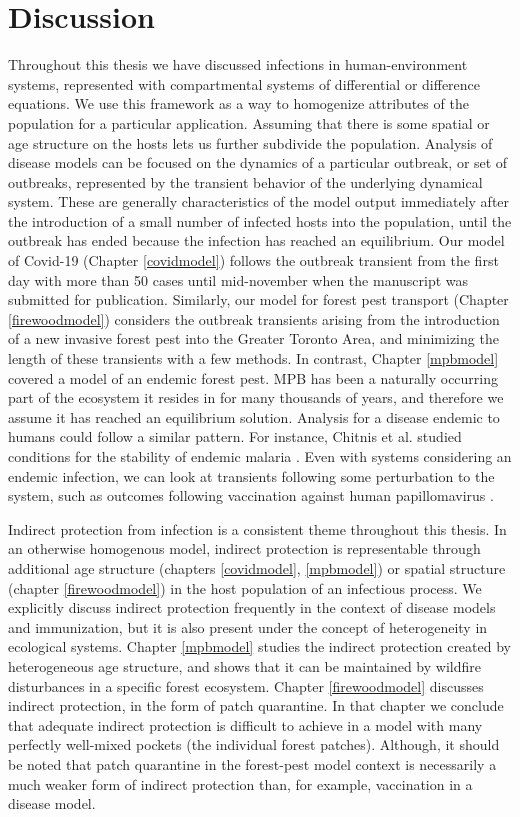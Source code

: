 \section{Discussion}

Throughout this thesis we have discussed infections in human-environment systems, represented with compartmental systems of differential or difference equations. We use this framework as a way to homogenize attributes of the population for a particular application. Assuming that there is some spatial or age structure on the hosts lets us further subdivide the population. Analysis of disease models can be focused on the dynamics of a particular outbreak, or set of outbreaks, represented by the transient behavior of the underlying dynamical system. These are generally characteristics of the model output immediately after the introduction of a small number of infected hosts into the population, until the outbreak has ended because the infection has reached an equilibrium. Our model of Covid-19 (Chapter \ref{covidmodel}) follows the outbreak transient from the first day with more than 50 cases until mid-november when the manuscript was submitted for publication. Similarly, our model for forest pest transport (Chapter \ref{firewoodmodel}) considers the outbreak transients arising from the introduction of a new invasive forest pest into the Greater Toronto Area, and minimizing the length of these transients with a few methods. In contrast, Chapter \ref{mpbmodel} covered a model of an endemic forest pest. MPB has been a naturally occurring part of the ecosystem it resides in for many thousands of years, and therefore we assume it has reached an equilibrium solution. Analysis for a disease endemic to humans could follow a similar pattern. For instance, Chitnis et al. studied conditions for the stability of endemic malaria \cite{chitnis2006bifurcation}. Even with systems considering an endemic infection, we can look at transients following some perturbation to the system, such as outcomes following vaccination against human papillomavirus \cite{lee2012mathematical}. 

Indirect protection from infection is a consistent theme throughout this thesis. In an otherwise homogenous model, indirect protection is representable through additional age structure (chapters \ref{covidmodel}, \ref{mpbmodel}) or spatial structure (chapter \ref{firewoodmodel}) in the host population of an infectious process. We explicitly discuss indirect protection frequently in the context of disease models and immunization, but it is also present under the concept of heterogeneity in ecological systems. Chapter \ref{mpbmodel} studies the indirect protection created by heterogeneous age structure, and shows that it can be maintained by  wildfire disturbances in a specific forest ecosystem. Chapter \ref{firewoodmodel} discusses indirect protection, in the form of patch quarantine. In that chapter we conclude that adequate indirect protection is difficult to achieve in a model with many perfectly well-mixed pockets (the individual forest patches). Although, it should be noted that patch quarantine in the forest-pest model context is necessarily a much weaker form of indirect protection than, for example, vaccination in a disease model.

